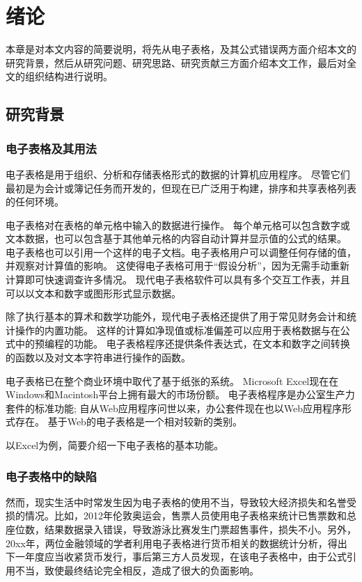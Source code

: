 \chapter{绪论}\label{introduction}

本章是对本文内容的简要说明，将先从电子表格，及其公式错误两方面介绍本文的研究背景，然后从研究问题、研究思路、研究贡献三方面介绍本文工作，最后对全文的组织结构进行说明。

\section{研究背景}

\subsection{电子表格及其用法}

电子表格是用于组织、分析和存储表格形式的数据的计算机应用程序。
尽管它们最初是为会计或簿记任务而开发的，但现在已广泛用于构建，排序和共享表格列表的任何环境。

电子表格对在表格的单元格中输入的数据进行操作。
每个单元格可以包含数字或文本数据，也可以包含基于其他单元格的内容自动计算并显示值的公式的结果。
电子表格也可以引用一个这样的电子文档。电子表格用户可以调整任何存储的值，并观察对计算值的影响。
这使得电子表格可用于“假设分析”，因为无需手动重新计算即可快速调查许多情况。
现代电子表格软件可以具有多个交互工作表，并且可以以文本和数字或图形形式显示数据。

除了执行基本的算术和数学功能外，现代电子表格还提供了用于常见财务会计和统计操作的内置功能。
这样的计算如净现值或标准偏差可以应用于表格数据与在公式中的预编程的功能。
电子表格程序还提供条件表达式，在文本和数字之间转换的函数以及对文本字符串进行操作的函数。

电子表格已在整个商业环境中取代了基于纸张的系统。
Microsoft Excel现在在Windows和Macintosh平台上拥有最大的市场份额。
电子表格程序是办公室生产力套件的标准功能; 自从Web应用程序问世以来，办公套件现在也以Web应用程序形式存在。
基于Web的电子表格是一个相对较新的类别。

以Excel为例，简要介绍一下电子表格的基本功能。

\subsection{电子表格中的缺陷}

然而，现实生活中时常发生因为电子表格的使用不当，导致较大经济损失和名誉受损的情况。比如，2012年伦敦奥运会，售票人员使用电子表格来统计已售票数和总座位数，结果数据录入错误，导致游泳比赛发生门票超售事件，损失不小。另外，20xx年，两位金融领域的学者利用电子表格进行货币相关的数据统计分析，得出下一年度应当收紧货币发行，事后第三方人员发现，在该电子表格中，由于公式引用不当，致使最终结论完全相反，造成了很大的负面影响。

